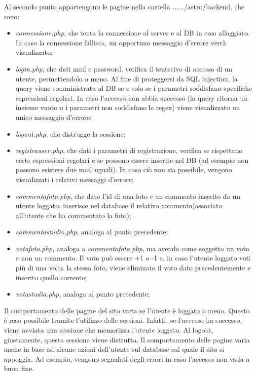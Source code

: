 	Al secondo punto appartengono le pagine nella cartella ....../astro/backend, che sono:
	\begin{itemize}
	\item \textit{connessione.php}, che tenta la connessione al server e al DB in esso alloggiato. In caso la connessione fallisca, un opportuno messaggio d'errore verrà visualizzato;
	\item \textit{login.php}, che dati mail e password, verifica il tentativo di accesso di un utente, permettendolo o meno. Al fine di proteggersi da SQL injection, la query viene somministrata al DB se e solo se i parametri soddisfano specifiche espressioni regolari. In caso l'accesso non abbia successo (la query ritorna un insieme vuoto o i parametri non soddisfano le regex) viene visualizzato un unico messaggio d'errore;
	\item \textit{logout.php}, che distrugge la sessione;
	\item \textit{registrauser.php}, che dati i parametri di registrazione, verifica se rispettano certe espressioni regolari e se possono essere inserite nel DB (ad esempio non possono esistere due mail uguali). In caso ciò non sia possibile, vengono visualizzati i relativi messaggi d'errore;
	\item \textit{commentafoto.php}, che dato l'id di una foto e un commento inserito da un utente loggato, inserisce nel database il relativo commento(associato all'utente che ha commentato la foto);
	\item \textit{commentastudio.php}, analoga al punto precedente;
	\item \textit{votafoto.php}, analoga a \textit{commentafoto.php}, ma avendo come soggetto un voto e non un commento. Il voto può essere +1 o -1 e, in caso l'utente loggato voti più di una volta la stessa foto, viene eliminato il voto dato precedentemente e inserito quello corrente;
	\item \textit{votastudio.php}, analoga al punto precedente;
	\end{itemize}
	
	Il comportamento delle pagine del sito varia se l'utente è loggato o meno. Questo è reso possibile tramite l'utilizzo delle sessioni. Infatti, se l'accesso ha successo, viene avviata una sessione che memorizza l'utente loggato. Al logout, giustamente, questa sessione viene distrutta. Il comportamento delle pagine varia anche in base ad alcune azioni dell'utente sul database sul quale il sito si appoggia. Ad esempio, vengono segnalati degli errori in caso l'accesso non vada a buon fine.
	

